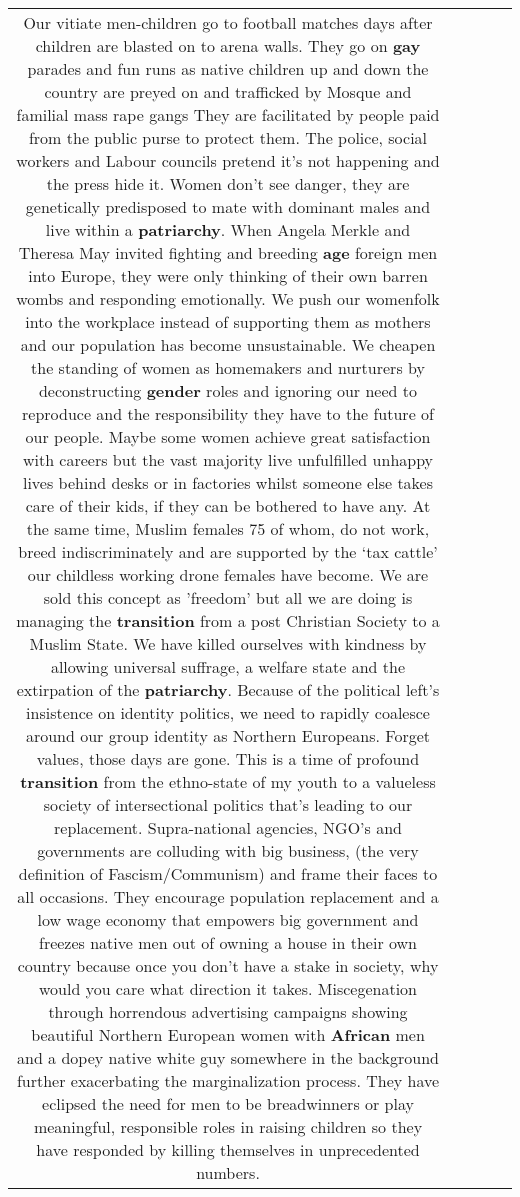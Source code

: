 \documentclass[11pt]{article}
\newlength\mylength
\begin{document}
\begin{center}
\begin{longtable}{|C{.65\mylength}|C{.30\mylength}|C{.12\mylength}|C{.12\mylength}|C{.12\mylength}|}
Our vitiate men-children go to football matches days after children are blasted on to arena walls. They go on \textbf{g\textbf{ay}} parades and fun runs as native children up and down the country are preyed on and trafficked by Mosque and familial mass rape gangs They are facilitated by people paid from the public purse to protect them. The police, social workers and Labour councils pretend it's not happening and the press hide it.
Women don't see danger, they are genetically predisposed to mate with dominant males and live within a \textbf{patriarchy}. When Angela Merkle and Theresa May invited fighting and breeding \textbf{age} foreign men into Europe, they were only thinking of their own barren wombs and responding emotionally. 
We push our womenfolk into the workplace instead of supporting them as mothers and our population has become unsustainable. We cheapen the standing of women as homemakers and nurturers by deconstructing \textbf{gender} roles and ignoring our need to reproduce and the responsibility they have to the future of our people. Maybe some women achieve great satisfaction with careers but the vast majority live unfulfilled unhappy lives behind desks or in factories whilst someone else takes care of their kids, if they can be bothered to have any. At the same time, Muslim females 75 of whom, do not work, breed indiscriminately and are supported by the ‘tax cattle' our childless working drone females have become. We are sold this concept as 'freedom' but all we are doing is managing the \textbf{transition} from a post Christian Society to a Muslim State.  
We have killed ourselves with kindness by allowing universal suffrage, a welfare state and the extirpation of the \textbf{patriarchy}.   
Because of the political left's insistence on identity politics, we need to rapidly coalesce around our group identity as Northern Europeans. Forget values, those days are gone. This is a time of profound \textbf{transition} from the ethno-state of my youth to a valueless society of intersectional politics that's leading to our replacement. 
Supra-national agencies, NGO's and governments are colluding with big business, (the very definition of Fascism/Communism) and frame their faces to all occasions. They encourage population replacement and a low wage economy that empowers big government and freezes native men out of owning a house in their own country because once you don't have a stake in society, why would you care what direction it takes. 
Miscegenation through horrendous advertising campaigns showing beautiful Northern European women with \textbf{African} men and a dopey native white guy somewhere in the background further exacerbating the marginalization process. They have eclipsed the need for men to be breadwinners or play meaningful, responsible roles in raising children so they have responded by killing themselves in unprecedented numbers.

\end{longtable}
\end{center}
\end{document}
